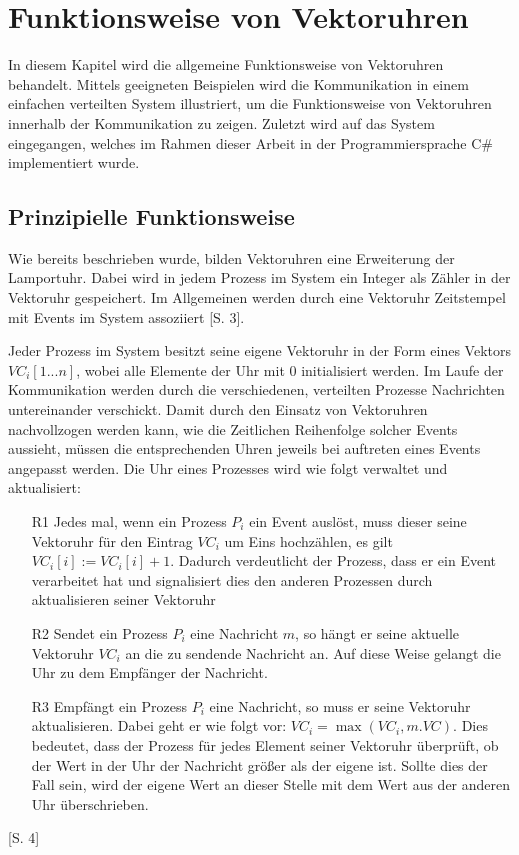 \section{Funktionsweise von Vektoruhren}

In diesem Kapitel wird die allgemeine Funktionsweise von Vektoruhren behandelt. Mittels geeigneten Beispielen wird die Kommunikation in einem einfachen verteilten System illustriert, um die Funktionsweise von Vektoruhren innerhalb der Kommunikation zu zeigen. Zuletzt wird auf das System eingegangen, welches im Rahmen dieser Arbeit in der Programmiersprache C\# implementiert wurde.
\subsection{Prinzipielle Funktionsweise}
\label{prinzipFunktion}
Wie bereits beschrieben wurde, bilden Vektoruhren eine Erweiterung der Lamportuhr. Dabei wird in jedem Prozess im System ein Integer als Zähler in der Vektoruhr gespeichert. Im Allgemeinen werden durch eine Vektoruhr Zeitstempel mit Events im System assoziiert \cite{Baldoni:2002:FDC:1435723.1437765}[S. 3].

Jeder Prozess im System besitzt seine eigene Vektoruhr in der Form eines Vektors $VC_i[1...n]$, wobei alle Elemente der Uhr mit $0$ initialisiert werden. Im Laufe der Kommunikation werden durch die verschiedenen, verteilten Prozesse Nachrichten untereinander verschickt. Damit durch den Einsatz von Vektoruhren nachvollzogen werden kann, wie die Zeitlichen Reihenfolge solcher Events aussieht, müssen die entsprechenden Uhren jeweils bei auftreten eines Events angepasst werden.
Die Uhr eines Prozesses wird wie folgt verwaltet und aktualisiert:

\begin{itemize}
	\item[R1]Jedes mal, wenn ein Prozess $P_i$ ein Event auslöst, muss dieser seine Vektoruhr für den Eintrag $VC_i$ um Eins hochzählen, es gilt  $VC_i[i] := VC_i[i] + 1$. Dadurch verdeutlicht der Prozess, dass er ein Event verarbeitet hat und signalisiert dies den anderen Prozessen durch aktualisieren seiner Vektoruhr 
	\item[R2]Sendet ein Prozess $P_i$ eine Nachricht $m$, so hängt er seine aktuelle Vektoruhr $VC_i$ an die zu sendende Nachricht an. Auf diese Weise gelangt die Uhr zu dem Empfänger der Nachricht.
	\item[R3]Empfängt ein Prozess $P_i$ eine Nachricht, so muss er seine Vektoruhr aktualisieren. Dabei geht er wie folgt vor: $VC_i = \max(VC_i, m.VC)$. Dies bedeutet, dass der Prozess für jedes Element seiner Vektoruhr überprüft, ob der Wert in der Uhr der Nachricht größer als der eigene ist. Sollte dies der Fall sein, wird der eigene Wert an dieser Stelle mit dem Wert aus der anderen Uhr überschrieben.\label{R3}
\end{itemize} \cite{Baldoni:2002:FDC:1435723.1437765}[S. 4]

